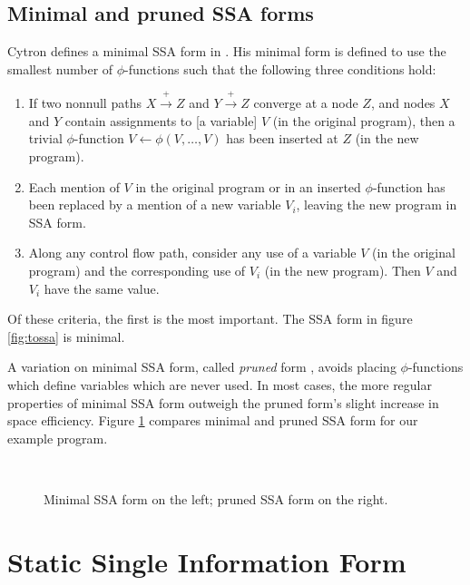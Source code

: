 \documentclass[12pt,notitlepage,twoside]{article}
\newcommand{\phifunction}{$\phi$-function}
\newcommand{\path}{\ensuremath{\rightarrow}}
\newcommand{\pathplus}{\ensuremath{\stackrel{+}{\path}}}
\begin{document}
\subsection{Minimal and pruned SSA forms}
Cytron defines a minimal SSA form in \cite{cytron91:ssa}.  His minimal
form is defined to use the smallest number of \phifunction{s} such
that the following three conditions hold:
\begin{enumerate}
\item If two nonnull paths $X \pathplus Z$ and $Y \pathplus Z$
converge at a node $Z$, and nodes $X$ and $Y$ contain assignments to
[a variable] $V$ (in the original program), then a trivial
\phifunction{} $V \leftarrow \phi(V, \ldots, V)$ has been inserted at
$Z$ (in the new program). \label{criteria1}
\item Each mention of $V$ in the original program or in an inserted
\phifunction{} has been replaced by a mention of a new variable $V_i$,
leaving the new program in SSA form.
\item Along any control flow path, consider any use of a variable $V$
(in the original program) and the corresponding use of $V_i$ (in the
new program).  Then $V$ and $V_i$ have the same value.
\end{enumerate}
Of these criteria, the first %
is the most important.
The SSA form in figure \ref{fig:tossa} is minimal.

A variation
on minimal SSA form, called \textit{pruned} form \cite{ferrante91:pruned},
avoids placing \phifunction{s} which define variables which are never used.
In most cases, the more regular properties of minimal SSA form
outweigh the pruned form's slight increase in space efficiency.
Figure \ref{fig:prunedssa} compares minimal and pruned SSA form for
our example program.
\begin{figure}\label{fig:prunedssa}
\begin{center}
 \vline\ 
\end{center}
\caption{Minimal SSA form on the left; pruned SSA form on the right.}
\end{figure}

\section{Static Single Information Form}
\end{document}
